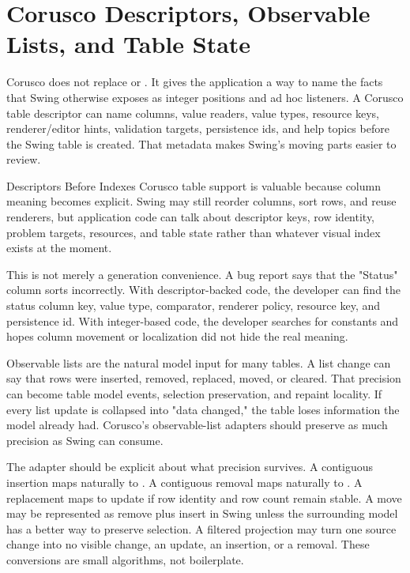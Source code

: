 \section{Corusco Descriptors, Observable Lists, and Table State}

Corusco does not replace  or . It gives the application a way to name the facts that Swing otherwise exposes as integer positions and ad hoc listeners. A Corusco table descriptor can name columns, value readers, value types, resource keys, renderer/editor hints, validation targets, persistence ids, and help topics before the Swing table is created. That metadata makes Swing's moving parts easier to review.

\begin{coruscobox}{Descriptors Before Indexes}
Corusco table support is valuable because column meaning becomes explicit. Swing may still reorder columns, sort rows, and reuse renderers, but application code can talk about descriptor keys, row identity, problem targets, resources, and table state rather than whatever visual index exists at the moment.
\end{coruscobox}

This is not merely a generation convenience. A bug report says that the "Status" column sorts incorrectly. With descriptor-backed code, the developer can find the status column key, value type, comparator, renderer policy, resource key, and persistence id. With integer-based code, the developer searches for constants and hopes column movement or localization did not hide the real meaning.

Observable lists are the natural model input for many tables. A list change can say that rows were inserted, removed, replaced, moved, or cleared. That precision can become table model events, selection preservation, and repaint locality. If every list update is collapsed into "data changed," the table loses information the model already had. Corusco's observable-list adapters should preserve as much precision as Swing can consume.

The adapter should be explicit about what precision survives. A contiguous insertion maps naturally to . A contiguous removal maps naturally to . A replacement maps to update if row identity and row count remain stable. A move may be represented as remove plus insert in Swing unless the surrounding model has a better way to preserve selection. A filtered projection may turn one source change into no visible change, an update, an insertion, or a removal. These conversions are small algorithms, not boilerplate.

